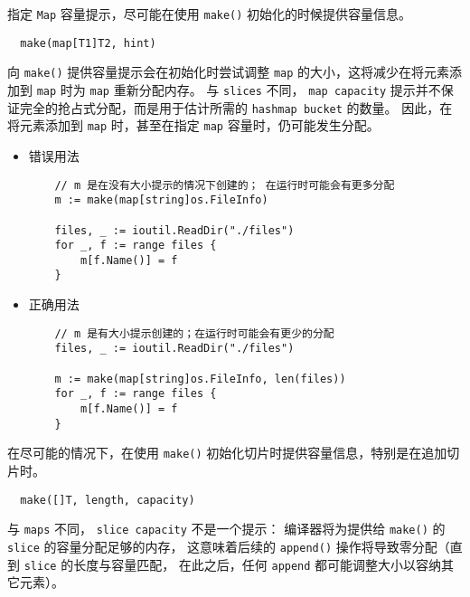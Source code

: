 指定 \texttt{Map} 容量提示，尽可能在使用 \texttt{make()} 初始化的时候提供容量信息。
\begin{verbatim}
  make(map[T1]T2, hint)
\end{verbatim}

向 \texttt{make()} 提供容量提示会在初始化时尝试调整 \texttt{map} 的大小，这将减少在将元素添加到 \texttt{map} 时为 \texttt{map} 重新分配内存。
与 \texttt{slices} 不同， \texttt{map capacity} 提示并不保证完全的抢占式分配，而是用于估计所需的 \texttt{hashmap bucket} 的数量。 因此，在将元素添加到 \texttt{map} 时，甚至在指定 \texttt{map} 容量时，仍可能发生分配。
\begin{itemize}[leftmargin=4em]
\item 错误用法

  \begin{verbatim}
    // m 是在没有大小提示的情况下创建的； 在运行时可能会有更多分配
    m := make(map[string]os.FileInfo)

    files, _ := ioutil.ReadDir("./files")
    for _, f := range files {
    	m[f.Name()] = f
    }
  \end{verbatim}
\item 正确用法

  \begin{verbatim}
    // m 是有大小提示创建的；在运行时可能会有更少的分配
    files, _ := ioutil.ReadDir("./files")

    m := make(map[string]os.FileInfo, len(files))
    for _, f := range files {
    	m[f.Name()] = f
    }
  \end{verbatim}
\end{itemize}

在尽可能的情况下，在使用 \texttt{make()} 初始化切片时提供容量信息，特别是在追加切片时。
\begin{verbatim}
  make([]T, length, capacity)
\end{verbatim}

与 \texttt{maps} 不同， \texttt{slice capacity} 不是一个提示：
编译器将为提供给 \texttt{make()} 的 \texttt{slice} 的容量分配足够的内存，
这意味着后续的 \texttt{append()} 操作将导致零分配（直到 \texttt{slice} 的长度与容量匹配，
在此之后，任何 \texttt{append} 都可能调整大小以容纳其它元素）。
